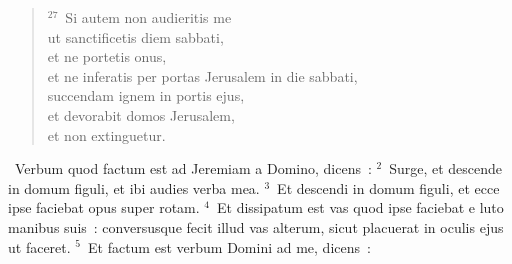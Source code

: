 \begin{flushleft}
\begin{verse}
${}^{27}$~Si autem non audieritis me\\ ut sanctificetis diem sabbati,\\ et ne portetis onus,\\ et ne inferatis per portas Jerusalem in die sabbati,\\ succendam ignem in portis ejus,\\ et devorabit domos Jerusalem,\\ et non extinguetur.\end{verse}\end{flushleft}


~Verbum quod factum est ad Jeremiam a Domino, dicens~:
${}^{2}$~Surge, et descende in domum figuli, et ibi audies verba mea.
${}^{3}$~Et descendi in domum figuli, et ecce ipse faciebat opus super rotam.
${}^{4}$~Et dissipatum est vas quod ipse faciebat e luto manibus suis~: conversusque fecit illud vas alterum, sicut placuerat in oculis ejus ut faceret.
${}^{5}$~Et factum est verbum Domini ad me, dicens~:
